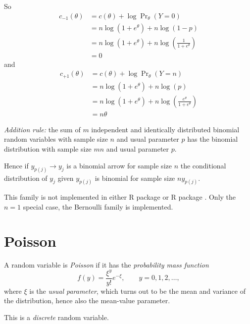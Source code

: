 So
\begin{align*}
   c_{- 1}(\theta)
   & =
   c(\theta) + \log \Pr\nolimits_\theta(Y = 0)
   \\
   & =
   n \log\left(1 + e^\theta\right)
   +
   n \log (1 - p)
   \\
   & =
   n \log\left(1 + e^\theta\right)
   +
   n \log \left(\frac{1}{1 + e^\theta}\right)
   \\
   & =
   0
\end{align*}
and
\begin{align*}
   c_{+ 1}(\theta)
   & =
   c(\theta) + \log \Pr\nolimits_\theta(Y = n)
   \\
   & =
   n \log\left(1 + e^\theta\right)
   +
   n \log (p)
   \\
   & =
   n \log\left(1 + e^\theta\right)
   +
   n \log \left(\frac{e^\theta}{1 + e^\theta}\right)
   \\
   & =
   n \theta
\end{align*}

\emph{Addition rule:}
the sum of $m$ independent and identically distributed
binomial random variables with sample size $n$ and usual parameter $p$
has the binomial distribution with sample size $m n$ and usual parameter $p$.

Hence if $y_{p(j)} \longrightarrow y_j$ is a binomial arrow for sample size $n$
the conditional distribution of $y_j$ given $y_{p(j)}$ is binomial
for sample size $n y_{p(j)}$.

This family is not implemented in either R package  or
R package .  Only the $n = 1$ special case, the Bernoulli
family is implemented.

\section{Poisson}
\label{sec:poisson}

A random variable is \emph{Poisson} if it has
the \emph{probability mass function}
\begin{equation} \label{eq:poisson-pmf}
   f(y) = \frac{\xi^y}{y !} e^{- \xi}, \qquad y = 0, 1, 2, \ldots,
\end{equation}
where $\xi$ is the \emph{usual parameter}, which turns out to be the
mean and variance of the distribution, hence also the mean-value parameter.

This is a \emph{discrete} random variable.

